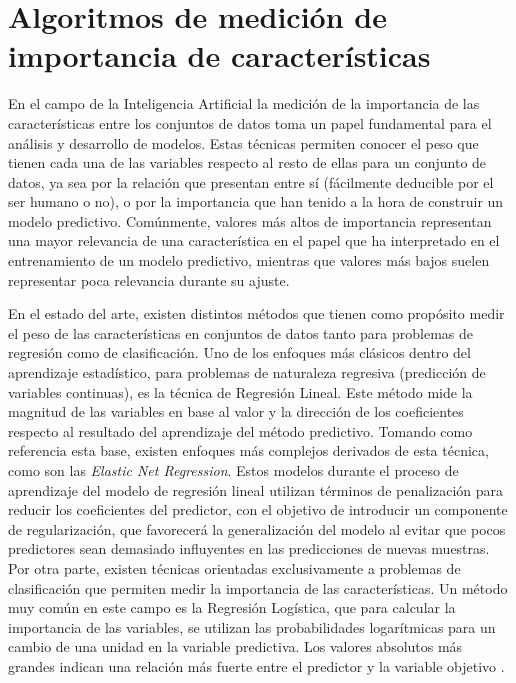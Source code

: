 \documentclass{uathesis-es}
\begin{document}
	
	\section{Algoritmos de medición de importancia de características}
	\label{SOAT_FEATURE_IMPORTANCE_METHODS}
	
	En el campo de la Inteligencia Artificial la medición de la importancia de las características entre los conjuntos de datos toma un papel fundamental para el análisis y desarrollo de modelos. Estas técnicas permiten conocer el peso que tienen cada una de las variables respecto al resto de ellas para un conjunto de datos, ya sea por la relación que presentan entre sí (fácilmente deducible por el ser humano o no), o por la importancia que han tenido a la hora de construir un modelo predictivo. Comúnmente, valores más altos de importancia representan una mayor relevancia de una característica  en el papel que ha interpretado en el entrenamiento de un modelo predictivo, mientras que valores más bajos suelen representar poca relevancia durante su ajuste.
	
	En el estado del arte, existen distintos métodos que tienen como propósito medir el peso de las características en conjuntos de datos tanto para problemas de regresión como de clasificación. Uno de los enfoques más clásicos dentro del aprendizaje estadístico, para problemas de naturaleza regresiva (predicción de variables continuas), es la técnica de Regresión Lineal. Este método mide la magnitud de las variables en base al valor y la dirección de los coeficientes respecto al resultado del aprendizaje del método predictivo. Tomando como referencia esta base, existen enfoques más complejos derivados de esta técnica, como son las \textit{Elastic Net Regression}. Estos modelos durante el proceso de aprendizaje del modelo de regresión lineal utilizan términos de penalización para reducir los coeficientes del predictor, con el objetivo de introducir un componente de regularización, que favorecerá la generalización del modelo al evitar que pocos predictores sean demasiado influyentes en las predicciones de nuevas muestras. Por otra parte, existen técnicas orientadas exclusivamente a problemas de clasificación que permiten medir la importancia de las características. Un método muy común en este campo es la Regresión Logística, que para calcular la importancia de las variables, se utilizan las probabilidades logarítmicas para un cambio de una unidad en la variable predictiva. Los valores absolutos más grandes indican una relación más fuerte entre el predictor y la variable objetivo \cite{Saarela2021}.
	
\end{document}
